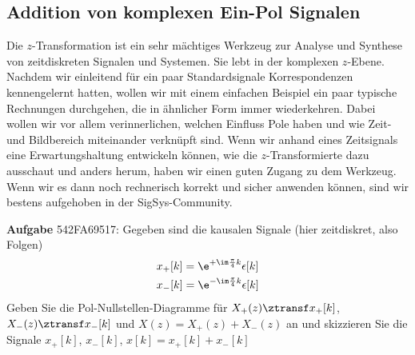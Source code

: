 \subsection{Addition von komplexen Ein-Pol Signalen}
\label{sec:542FA69517}
\begin{Ziel}
Die $z$-Transformation ist ein sehr mächtiges Werkzeug zur Analyse und Synthese
von zeitdiskreten Signalen und Systemen. Sie lebt in der komplexen $z$-Ebene.
Nachdem wir einleitend für ein paar Standardsignale Korrespondenzen
kennengelernt hatten, wollen wir mit einem einfachen Beispiel ein paar
typische Rechnungen durchgehen, die in ähnlicher Form immer wiederkehren.
Dabei wollen wir vor allem verinnerlichen, welchen Einfluss Pole haben
und wie Zeit- und Bildbereich miteinander verknüpft sind. Wenn wir anhand
eines Zeitsignals eine Erwartungshaltung entwickeln können, wie die $z$-Transformierte
dazu ausschaut und anders herum, haben wir einen guten Zugang zu dem Werkzeug.
Wenn wir es dann noch rechnerisch korrekt und sicher anwenden können, sind wir
bestens aufgehoben in der SigSys-Community.
\end{Ziel}
\textbf{Aufgabe} {\tiny 542FA69517}:
Gegeben sind die kausalen Signale (hier zeitdiskret, also Folgen)
\begin{align}
&x_+[k]=\e^{+\im\frac{\pi}{4} k} \epsilon[k]\\
&x_-[k]=\e^{-\im\frac{\pi}{4} k} \epsilon[k]
\end{align}
Geben Sie die Pol-Nullstellen-Diagramme für
$X_+(z) \ztransf x_+[k]$,
$X_-(z) \ztransf x_-[k]$ und
$X(z) = X_+(z) + X_-(z)$ an und skizzieren Sie die Signale
$x_+[k]$, $x_-[k]$, $x[k]=x_+[k]+x_-[k]$

